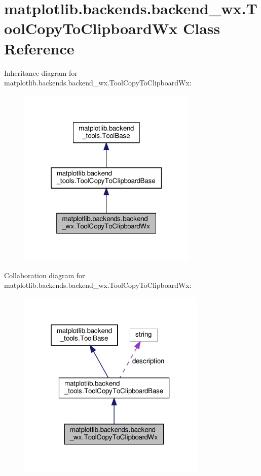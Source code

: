 \hypertarget{classmatplotlib_1_1backends_1_1backend__wx_1_1ToolCopyToClipboardWx}{}\section{matplotlib.\+backends.\+backend\+\_\+wx.\+Tool\+Copy\+To\+Clipboard\+Wx Class Reference}
\label{classmatplotlib_1_1backends_1_1backend__wx_1_1ToolCopyToClipboardWx}


Inheritance diagram for matplotlib.\+backends.\+backend\+\_\+wx.\+Tool\+Copy\+To\+Clipboard\+Wx\+:
\nopagebreak
\begin{figure}[H]
\begin{center}
\leavevmode
\includegraphics[width=243pt]{classmatplotlib_1_1backends_1_1backend__wx_1_1ToolCopyToClipboardWx__inherit__graph}
\end{center}
\end{figure}


Collaboration diagram for matplotlib.\+backends.\+backend\+\_\+wx.\+Tool\+Copy\+To\+Clipboard\+Wx\+:
\nopagebreak
\begin{figure}[H]
\begin{center}
\leavevmode
\includegraphics[width=255pt]{classmatplotlib_1_1backends_1_1backend__wx_1_1ToolCopyToClipboardWx__coll__graph}
\end{center}
\end{figure}
